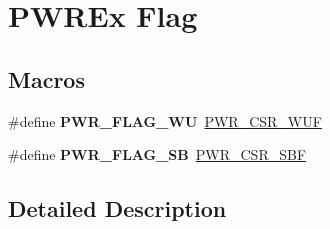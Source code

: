 \hypertarget{group___p_w_r_ex___flag}{}\section{P\+W\+R\+Ex Flag}
\label{group___p_w_r_ex___flag}
\subsection*{Macros}
\begin{DoxyCompactItemize}
\item 
\mbox{\label{group___p_w_r_ex___flag_ga2d06760a5769e729b06d41e37036d58e}} 
\#define {\bfseries P\+W\+R\+\_\+\+F\+L\+A\+G\+\_\+\+WU}~\hyperlink{group___peripheral___registers___bits___definition_ga9465bb7ad9ca936688344e2a077539e6}{P\+W\+R\+\_\+\+C\+S\+R\+\_\+\+W\+UF}
\item 
\mbox{\label{group___p_w_r_ex___flag_ga9e55f0b5dec2346d5c8dee3ab3c0c2df}} 
\#define {\bfseries P\+W\+R\+\_\+\+F\+L\+A\+G\+\_\+\+SB}~\hyperlink{group___peripheral___registers___bits___definition_gab4fd42f153660593cad6f4fe22ff76bb}{P\+W\+R\+\_\+\+C\+S\+R\+\_\+\+S\+BF}
\end{DoxyCompactItemize}


\subsection{Detailed Description}
